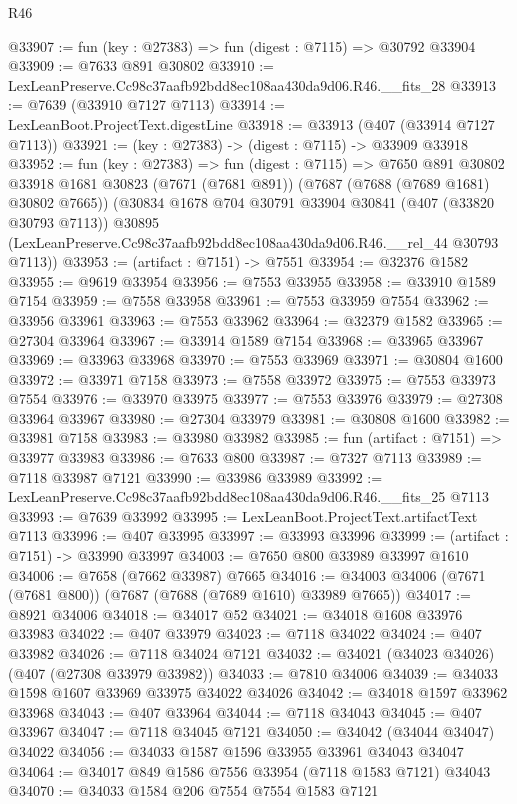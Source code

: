 \begin{lexlean}{R46}
\begin{coremodule}
@33907 := fun (key : @27383) => fun (digest : @7115) => @30792 @33904
@33909 := @7633 @891 @30802
@33910 := LexLeanPreserve.Cc98c37aafb92bdd8ec108aa430da9d06.R46.__fits_28
@33913 := @7639 (@33910 @7127 @7113)
@33914 := LexLeanBoot.ProjectText.digestLine
@33918 := @33913 (@407 (@33914 @7127 @7113))
@33921 := (key : @27383) -> (digest : @7115) -> @33909 @33918
@33952 := fun (key : @27383) =>
  fun (digest : @7115) =>
  @7650
    @891
    @30802
    @33918
    @1681
    @30823
    (@7671 (@7681 @891))
    (@7687 (@7688 (@7689 @1681) @30802 @7665))
    (@30834
      @1678
      @704
      @30791
      @33904
      @30841
      (@407 (@33820 @30793 @7113))
      @30895
      (LexLeanPreserve.Cc98c37aafb92bdd8ec108aa430da9d06.R46.__rel_44 @30793 @7113))
@33953 := (artifact : @7151) -> @7551
@33954 := @32376 @1582
@33955 := @9619 @33954
@33956 := @7553 @33955
@33958 := @33910 @1589 @7154
@33959 := @7558 @33958
@33961 := @7553 @33959 @7554
@33962 := @33956 @33961
@33963 := @7553 @33962
@33964 := @32379 @1582
@33965 := @27304 @33964
@33967 := @33914 @1589 @7154
@33968 := @33965 @33967
@33969 := @33963 @33968
@33970 := @7553 @33969
@33971 := @30804 @1600
@33972 := @33971 @7158
@33973 := @7558 @33972
@33975 := @7553 @33973 @7554
@33976 := @33970 @33975
@33977 := @7553 @33976
@33979 := @27308 @33964 @33967
@33980 := @27304 @33979
@33981 := @30808 @1600
@33982 := @33981 @7158
@33983 := @33980 @33982
@33985 := fun (artifact : @7151) => @33977 @33983
@33986 := @7633 @800
@33987 := @7327 @7113
@33989 := @7118 @33987 @7121
@33990 := @33986 @33989
@33992 := LexLeanPreserve.Cc98c37aafb92bdd8ec108aa430da9d06.R46.__fits_25 @7113
@33993 := @7639 @33992
@33995 := LexLeanBoot.ProjectText.artifactText @7113
@33996 := @407 @33995
@33997 := @33993 @33996
@33999 := (artifact : @7151) -> @33990 @33997
@34003 := @7650 @800 @33989 @33997 @1610
@34006 := @7658 (@7662 @33987) @7665
@34016 := @34003 @34006 (@7671 (@7681 @800)) (@7687 (@7688 (@7689 @1610) @33989 @7665))
@34017 := @8921 @34006
@34018 := @34017 @52
@34021 := @34018 @1608 @33976 @33983
@34022 := @407 @33979
@34023 := @7118 @34022
@34024 := @407 @33982
@34026 := @7118 @34024 @7121
@34032 := @34021 (@34023 @34026) (@407 (@27308 @33979 @33982))
@34033 := @7810 @34006
@34039 := @34033 @1598 @1607 @33969 @33975 @34022 @34026
@34042 := @34018 @1597 @33962 @33968
@34043 := @407 @33964
@34044 := @7118 @34043
@34045 := @407 @33967
@34047 := @7118 @34045 @7121
@34050 := @34042 (@34044 @34047) @34022
@34056 := @34033 @1587 @1596 @33955 @33961 @34043 @34047
@34064 := @34017 @849 @1586 @7556 @33954 (@7118 @1583 @7121) @34043
@34070 := @34033 @1584 @206 @7554 @7554 @1583 @7121

\end{coremodule}
\end{lexlean}

